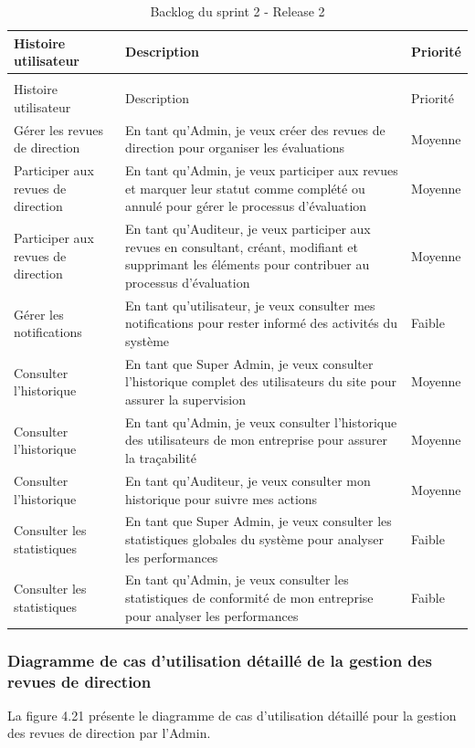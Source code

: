 \begin{longtable}{|>{\raggedright\arraybackslash}p{4cm}|>{\raggedright\arraybackslash}p{7cm}|>{\raggedright\arraybackslash}p{2cm}|}
\caption{Backlog du sprint 2 - Release 2}
\label{tab:sprint2_release2_backlog}\\
\hline
Histoire utilisateur & Description & Priorité \\
\hline
\endfirsthead
\multicolumn{3}{c}{\tablename\ \thetable\ -- suite} \\
\hline
Histoire utilisateur & Description & Priorité \\
\hline
\endhead
Gérer les revues de direction & En tant qu'Admin, je veux créer des revues de direction pour organiser les évaluations & Moyenne \\
\hline
Participer aux revues de direction & En tant qu'Admin, je veux participer aux revues et marquer leur statut comme complété ou annulé pour gérer le processus d'évaluation & Moyenne \\
\hline
Participer aux revues de direction & En tant qu'Auditeur, je veux participer aux revues en consultant, créant, modifiant et supprimant les éléments pour contribuer au processus d'évaluation & Moyenne \\
\hline
Gérer les notifications & En tant qu'utilisateur, je veux consulter mes notifications pour rester informé des activités du système & Faible \\
\hline
Consulter l'historique & En tant que Super Admin, je veux consulter l'historique complet des utilisateurs du site pour assurer la supervision & Moyenne \\
\hline
Consulter l'historique & En tant qu'Admin, je veux consulter l'historique des utilisateurs de mon entreprise pour assurer la traçabilité & Moyenne \\
\hline
Consulter l'historique & En tant qu'Auditeur, je veux consulter mon historique pour suivre mes actions & Moyenne \\
\hline
Consulter les statistiques & En tant que Super Admin, je veux consulter les statistiques globales du système pour analyser les performances & Faible \\
\hline
Consulter les statistiques & En tant qu'Admin, je veux consulter les statistiques de conformité de mon entreprise pour analyser les performances & Faible \\
\hline
\end{longtable}
\subsubsection{Diagramme de cas d'utilisation détaillé de la gestion des revues de direction}
\noindent La figure 4.21 présente le diagramme de cas d'utilisation détaillé pour la gestion des revues de direction par l'Admin.


